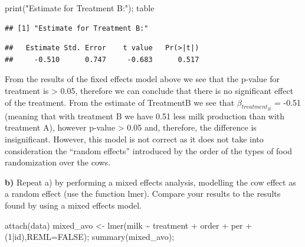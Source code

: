 \documentclass[
  10pt,
]{article}
\newenvironment{Shaded}{\begin{snugshade}}{\end{snugshade}}
\newcommand{\AttributeTok}[1]{\textcolor[rgb]{0.77,0.63,0.00}{#1}}
\newcommand{\ConstantTok}[1]{\textcolor[rgb]{0.00,0.00,0.00}{#1}}
\newcommand{\DecValTok}[1]{\textcolor[rgb]{0.00,0.00,0.81}{#1}}
\newcommand{\FunctionTok}[1]{\textcolor[rgb]{0.00,0.00,0.00}{#1}}
\newcommand{\NormalTok}[1]{#1}
\newcommand{\OtherTok}[1]{\textcolor[rgb]{0.56,0.35,0.01}{#1}}
\newcommand{\SpecialCharTok}[1]{\textcolor[rgb]{0.00,0.00,0.00}{#1}}
\newcommand{\StringTok}[1]{\textcolor[rgb]{0.31,0.60,0.02}{#1}}
\begin{document}
\begin{Shaded}
\begin{Highlighting}[]
\FunctionTok{print}\NormalTok{(}\StringTok{"Estimate for Treatment B:"}\NormalTok{); table}
\end{Highlighting}
\end{Shaded}

\begin{verbatim}
## [1] "Estimate for Treatment B:"
\end{verbatim}

\begin{verbatim}
##   Estimate Std. Error    t value   Pr(>|t|) 
##     -0.510      0.747     -0.683      0.517
\end{verbatim}

From the results of the fixed effects model above we see that the
p-value for treatment is \textgreater{} 0.05, therefore we can conclude
that there is no significant effect of the treatment. From the estimate
of TreatmentB we see that \(\beta_{treatment_B}\) = -0.51 (meaning that
with treatment B we have 0.51 less milk production than with treatment
A), however p-value \textgreater{} 0.05 and, therefore, the difference
is insignificant. However, this model is not correct as it does not take
into consideration the ``random effects'' introduced by the order of the
types of food randomization over the cows.

\textbf{b)} Repeat a) by performing a mixed effects analysis, modelling
the cow effect as a random effect (use the function lmer). Compare your
results to the results found by using a mixed effects model.

\begin{Shaded}
\begin{Highlighting}[]
\FunctionTok{attach}\NormalTok{(data)}
\NormalTok{mixed\_avo }\OtherTok{\textless{}{-}} \FunctionTok{lmer}\NormalTok{(milk }\SpecialCharTok{\textasciitilde{}}\NormalTok{ treatment }\SpecialCharTok{+}\NormalTok{ order }\SpecialCharTok{+}\NormalTok{ per }\SpecialCharTok{+}\NormalTok{ (}\DecValTok{1}\SpecialCharTok{|}\NormalTok{id),}\AttributeTok{REML=}\ConstantTok{FALSE}\NormalTok{); }\FunctionTok{summary}\NormalTok{(mixed\_avo);}
\end{Highlighting}
\end{Shaded}
\end{document}
